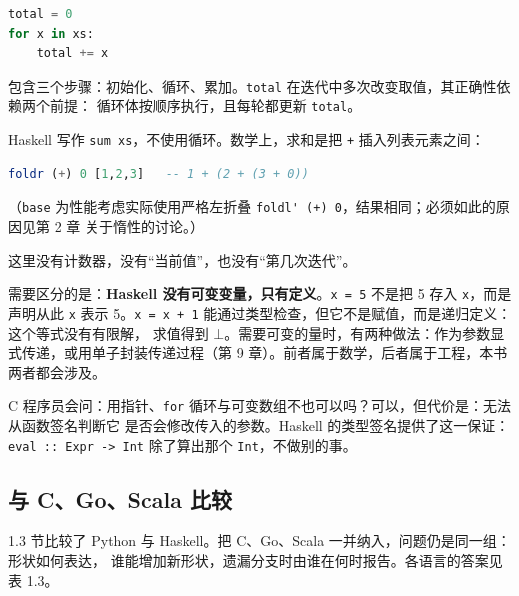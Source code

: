 \begin{lstlisting}[language=Python]
total = 0
for x in xs:
    total += x
\end{lstlisting}

包含三个步骤：初始化、循环、累加。\passthrough{\lstinline!total!} 在迭代中多次改变取值，其正确性依赖两个前提：
循环体按顺序执行，且每轮都更新 \passthrough{\lstinline!total!}。

Haskell 写作 \passthrough{\lstinline!sum xs!}，不使用循环。数学上，求和是把 \passthrough{\lstinline!+!} 插入列表元素之间：

\begin{lstlisting}[language=Haskell]
foldr (+) 0 [1,2,3]   -- 1 + (2 + (3 + 0))
\end{lstlisting}

（\passthrough{\lstinline!base!} 为性能考虑实际使用严格左折叠 \passthrough{\lstinline!foldl' (+) 0!}，结果相同；必须如此的原因见第 2 章
关于惰性的讨论。）

这里没有计数器，没有“当前值”，也没有“第几次迭代”。

需要区分的是：\textbf{Haskell 没有可变变量，只有定义}。\passthrough{\lstinline!x = 5!} 不是把 5 存入 \passthrough{\lstinline!x!}，而是声明从此
\passthrough{\lstinline!x!} 表示 5。\passthrough{\lstinline!x = x + 1!} 能通过类型检查，但它不是赋值，而是递归定义：这个等式没有有限解，
求值得到 \(\bot\)。需要可变的量时，有两种做法：作为参数显式传递，或用单子封装传递过程（第 9
章）。前者属于数学，后者属于工程，本书两者都会涉及。

C 程序员会问：用指针、\passthrough{\lstinline!for!} 循环与可变数组不也可以吗？可以，但代价是：无法从函数签名判断它
是否会修改传入的参数。Haskell 的类型签名提供了这一保证：\passthrough{\lstinline!eval :: Expr -> Int!} 除了算出那个
\passthrough{\lstinline!Int!}，不做别的事。

\subsection{与 C、Go、Scala 比较}\label{ux4e0e-cgoscala-ux6bd4ux8f83}

1.3 节比较了 Python 与 Haskell。把 C、Go、Scala 一并纳入，问题仍是同一组：形状如何表达，
谁能增加新形状，遗漏分支时由谁在何时报告。各语言的答案见表 1.3。

